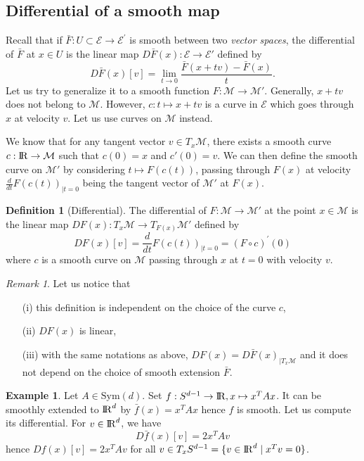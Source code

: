 \documentclass[10pt,a4paper]{book}
\theoremstyle{definition}
\newtheorem{defn}{Definition}[section]
\newtheorem{exm}{Example}[section]
\theoremstyle{plain}
\theoremstyle{remark}
\newtheorem{rmk}{Remark}[section]
\newcommand \M {\mathcal{M}}
\def\R{{\rm I\kern-0.16em R}}
\begin{document}
\subsection{Differential of a smooth map}
Recall that if $\bar{F}: U\subset \mathcal{E} \to \mathcal{E}^{\prime}$ is smooth between two \emph{vector spaces}, the differential of $\bar{F}$ at $x\in U$ is the linear map $D\bar{F}(x):\mathcal{E}\to\mathcal{E}'$ defined by
$$D\bar{F}(x)[v]=\lim_{t\to 0}\frac{\bar{F}(x+tv)-\bar{F}(x)}{t}.$$
Let us try to generalize it to a smooth function $F:\M \to \M'$. Generally, $x+tv$ does not belong to $\M$. However, $c:t\mapsto x+tv$ is a curve in $\mathcal{E}$ which goes through $x$ at velocity $v$. Let us use curves on $\M$ instead.
\par \medskip
We know that for any tangent vector $v\in T_x\M$, there exists a smooth curve $c:\R \to \M$ such that $c(0)=x$ and $c'(0)=v$. We can then define the smooth curve on $\M'$ by considering $t\mapsto F(c(t))$, passing through $F(x)$ at velocity $\frac{d}{dt}F(c(t))_{\mid t=0}$ being the tangent vector of $\M'$ at $F(x)$. 
\begin{defn}[Differential]
The differential of $F:\M \to \M'$ at the point $x\in \M$ is the linear map $DF(x):T_x\M \to T_{F(x)}\M'$ defined by
$$DF(x)[v]=\frac{d}{dt}F(c(t))_{\mid t=0}=(F\circ c)^{\prime}(0)$$
where $c$ is a smooth curve on $\M$ passing through $x$ at $t=0$ with velocity $v$.
\end{defn}
\begin{rmk}Let us notice that
\begin{enumerate}
\item[(i)] this definition is independent on the choice of the curve $c$,
\item[(ii)] $DF(x)$ is linear,
\item[(iii)] with the same notations as above, $DF(x)=D\bar{F}(x)_{\mid T_x\M}$ and it does not depend on the choice of smooth extension $\bar{F}$.
\end{enumerate}
\end{rmk}
\begin{exm}
Let $A\in \text{Sym}(d)$. Set $f:S^{d-1}\to \R, x \mapsto x^{T}Ax$. It can be smoothly extended to $\R^d$ by $\bar{f}(x)=x^{T}Ax$ hence $f$ is smooth. Let us compute its differential. For $v\in \R^d$, we have
$$D\bar{f}(x)[v]=2x^{T}Av$$
hence $Df(x)[v]=2x^{T}Av$ for all $v\in T_xS^{d-1}=\{v\in \R^d \mid x^{T}v=0\}$.
\end{exm}
\end{document}

